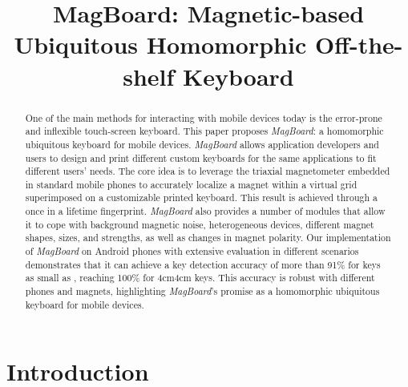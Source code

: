 \documentclass[conference]{IEEEtran}
\def \sys {\textit{MagBoard}}
\begin{document}
\author{
\and
{}
\and
{}
}

\title{MagBoard: Magnetic-based Ubiquitous Homomorphic Off-the-shelf Keyboard}

\maketitle

\begin{abstract}

One of the main methods for interacting with mobile devices today is the error-prone and inflexible touch-screen keyboard. This paper proposes \sys{}: a homomorphic ubiquitous keyboard for mobile devices. \sys{} allows application developers and users to design and print different custom keyboards for the same applications to fit different users' needs. 
The core idea is to leverage the triaxial magnetometer embedded in standard mobile phones to accurately localize a magnet within a virtual grid superimposed on a customizable printed keyboard. This result is achieved through a once in a lifetime fingerprint. \sys{} also provides a number of modules that allow it to cope with background magnetic noise, heterogeneous devices, different magnet shapes, sizes, and strengths, as well as changes in magnet polarity. Our implementation of \sys{} on Android phones with extensive evaluation in different scenarios demonstrates that it can achieve a key detection accuracy of more than 91\% for keys as small as , reaching 100\% for  4cm4cm keys. This accuracy is robust with different phones and magnets, highlighting \sys{}'s promise as a homomorphic ubiquitous keyboard for mobile devices.

\end{abstract}

\section{Introduction}
\end{document}
